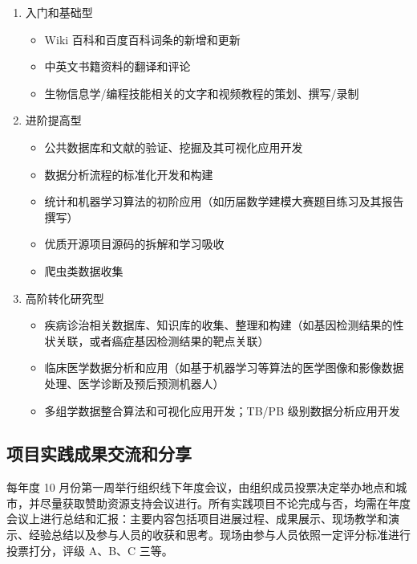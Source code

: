 \documentclass[]{article}
\providecommand{\tightlist}{%
  \setlength{\itemsep}{0pt}\setlength{\parskip}{0pt}}
\begin{document}
\begin{enumerate}
\def\labelenumi{\arabic{enumi}.}
\item
  入门和基础型

  \begin{itemize}
  \tightlist
  \item
    Wiki 百科和百度百科词条的新增和更新
  \item
    中英文书籍资料的翻译和评论
  \item
    生物信息学/编程技能相关的文字和视频教程的策划、撰写/录制
  \end{itemize}
\item
  进阶提高型

  \begin{itemize}
  \tightlist
  \item
    公共数据库和文献的验证、挖掘及其可视化应用开发
  \item
    数据分析流程的标准化开发和构建
  \item
    统计和机器学习算法的初阶应用（如历届数学建模大赛题目练习及其报告撰写）
  \item
    优质开源项目源码的拆解和学习吸收
  \item
    爬虫类数据收集
  \end{itemize}
\item
  高阶转化研究型

  \begin{itemize}
  \tightlist
  \item
    疾病诊治相关数据库、知识库的收集、整理和构建（如基因检测结果的性状关联，或者癌症基因检测结果的靶点关联）
  \item
    临床医学数据分析和应用（如基于机器学习等算法的医学图像和影像数据处理、医学诊断及预后预测机器人）
  \item
    多组学数据整合算法和可视化应用开发；TB/PB 级别数据分析应用开发
  \end{itemize}
\end{enumerate}

\subsection{项目实践成果交流和分享}

每年度 10
月份第一周举行组织线下年度会议，由组织成员投票决定举办地点和城市，并尽量获取赞助资源支持会议进行。所有实践项目不论完成与否，均需在年度会议上进行总结和汇报：主要内容包括项目进展过程、成果展示、现场教学和演示、经验总结以及参与人员的收获和思考。现场由参与人员依照一定评分标准进行投票打分，评级
A、B、C 三等。
\end{document}

